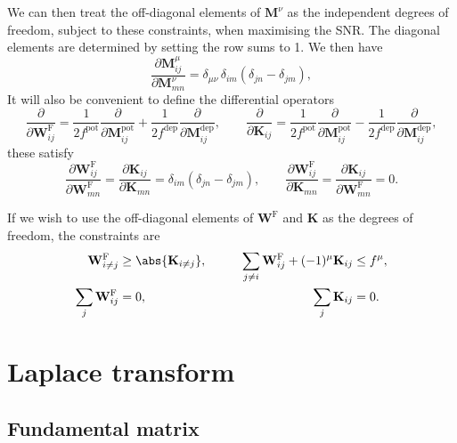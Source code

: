 \documentclass[12pt]{article}
\newcommand{\W}{\mathbf{W}}
\newcommand{\M}{\mathbf{M}}
\newcommand{\enc}{\mathbf{K}}
\newcommand{\frg}{\W^{\mathrm{F}}}
\newcommand{\pot}{^{\text{pot}}}
\newcommand{\dep}{^{\text{dep}}}
\renewcommand{\pdiff}[2]{\frac{\partial #1}{\partial #2}}
\begin{document}
We can then treat the off-diagonal elements of $\M^\nu$ as the independent degrees of freedom, subject to these constraints, when maximising the SNR.
The diagonal elements are determined by setting the row sums to 1.
We then have
%
\begin{equation}\label{eq:derivpd}
  \pdiff{\M^\mu_{ij}}{\M^\nu_{mn}} 
      = \delta_{\mu\nu}\, \delta_{im}(\delta_{jn}-\delta_{jm}),
\end{equation}
%
It will also be convenient to define the differential operators
%
\begin{equation}\label{eq:pertfe}
  \pdiff{}{\frg_{ij}} = \frac{1}{2f\pot} \pdiff{}{\M\pot_{ij}} + \frac{1}{2f\dep} \pdiff{}{\M\dep_{ij}},
  \qquad
  \pdiff{}{\enc_{ij}} = \frac{1}{2f\pot} \pdiff{}{\M\pot_{ij}} - \frac{1}{2f\dep} \pdiff{}{\M\dep_{ij}},
\end{equation}
%
these satisfy
%
\begin{equation}\label{eq:derivfe}
  \pdiff{\frg_{ij}}{\frg_{mn}} = \pdiff{\enc_{ij}}{\enc_{mn}} = \delta_{im}(\delta_{jn}-\delta_{jm}),
  \qquad
  \pdiff{\frg_{ij}}{\enc_{mn}} = \pdiff{\enc_{ij}}{\frg_{mn}} = 0.
\end{equation}
%

If we wish to use the off-diagonal elements of $\frg$ and $\enc$ as the degrees of freedom, the constraints are
%
\begin{equation}\label{eq:constrfe}
\begin{aligned}
  \frg_{i \neq j}   &\geq \abs{ \enc_{i \neq j} }, &\qquad
  \sum_{j\neq i}\frg_{ij} + (-1)^\mu \enc_{ij}  &\leq f^\mu, \\
  \sum_j \frg_{ij} &=0, &
  \sum_j \enc_{ij} &=0.
\end{aligned}
\end{equation}
%




\section{Laplace transform}\label{sec:laplace}

\subsection{Fundamental matrix \etc}\label{sec:lfund}
\end{document}
